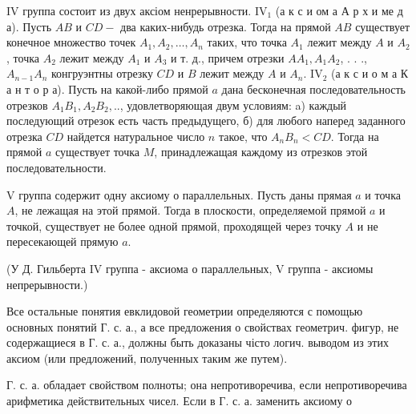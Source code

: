 \documentclass[10pt]{article}
\begin{document}
IV группа состоит из двух аксіом ненрерывности. $\mathrm{IV}_{1}$ (а к с и ом а А р х и ме д а). Пусть $A B$ и $C D-$ два каких-нибудь отрезка. Тогда на прямой $A B$ существует конечное множество точек $A_{1}, A_{2}, \ldots, A_{n}$ таких, что точка $A_{1}$ лежит между $A$ и $A_{2}$, точка $A_{2}$ лежит между $A_{1}$ и $A_{3}$ и т. д., причем отрезки $A A_{1}, A_{1} A_{2}$, . . ., $A_{n-1} A_{n}$ конгруэнтны отрезку $C D$ и $B$ лежит между $A$ и $A_{n}$. $\mathrm{IV}_{2}$ (а к с и о м а К а н т о р а). Пусть на какой-либо прямой $a$ дана бесконечная последовательность отрезков $A_{1} B_{1}, A_{2} B_{2}, . .$, удовлетворяющая двум условиям: a) каждый последующий отрезок есть часть предыдущего, б) для любого наперед заданного отрезка $C D$ найдется натуральное число $n$ такое, что $A_{n} B_{n}<C D$. Тогда на прямой $a$ существует точка $M$, принадлежащая каждому из отрезков этой последовательности.



V группа содержит одну аксиому о параллельных. Пусть даны прямая $a$ и точка $A$, не лежащая на этой прямой. Тогда в плоскости, определяемой прямой $a$ и точкой, существует не более одной прямой, проходящей через точку $A$ и не пересекающей прямую $a$.



(У Д. Гильберта IV группа - аксиома о параллельных, V группа - аксиомы непрерывности.)



Все остальные понятия евклидовой геометрии определяются с помощью основных понятий $Г$. с. а., а все предложения о свойствах геометрич. фигур, не содержащиеся в Г. с. а., должны быть доказаны чісто логич. выводом из этих аксиом (или предложений, полученных таким же путем).



Г. с. а. обладает свойством полноты; она непротиворечива, если непротиворечива арифметика действительных чисел. Если в Г. с. а. заменить аксиому о
\end{document}

